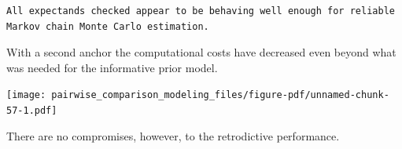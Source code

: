 \documentclass[
  letterpaper,
  DIV=11,
  numbers=noendperiod]{scrartcl}
\newenvironment{Shaded}{\begin{snugshade}}{\end{snugshade}}
\newcommand{\AttributeTok}[1]{\textcolor[rgb]{0.40,0.45,0.13}{#1}}
\newcommand{\ControlFlowTok}[1]{\textcolor[rgb]{0.00,0.23,0.31}{#1}}
\newcommand{\DecValTok}[1]{\textcolor[rgb]{0.68,0.00,0.00}{#1}}
\newcommand{\FunctionTok}[1]{\textcolor[rgb]{0.28,0.35,0.67}{#1}}
\newcommand{\NormalTok}[1]{\textcolor[rgb]{0.00,0.23,0.31}{#1}}
\newcommand{\OtherTok}[1]{\textcolor[rgb]{0.00,0.23,0.31}{#1}}
\newcommand{\SpecialCharTok}[1]{\textcolor[rgb]{0.37,0.37,0.37}{#1}}
\newcommand{\StringTok}[1]{\textcolor[rgb]{0.13,0.47,0.30}{#1}}
\begin{document}
\begin{verbatim}
All expectands checked appear to be behaving well enough for reliable
Markov chain Monte Carlo estimation.
\end{verbatim}

With a second anchor the computational costs have decreased even beyond
what was needed for the informative prior model.

\begin{Shaded}
\end{Shaded}

\texttt{[image: pairwise\_comparison\_modeling\_files/figure-pdf/unnamed-chunk-57-1.pdf]}

There are no compromises, however, to the retrodictive performance.

\begin{Shaded}
\end{Shaded}
\end{document}

